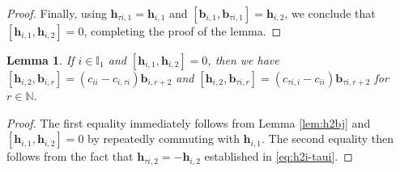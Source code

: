 \documentclass[11pt,reqno]{amsart}
\numberwithin{equation}{section}
\newtheorem{lem}[thm]{Lemma}
\theoremstyle{definition}
\theoremstyle{remark}
\newcommand{\bN}{\mathbb{N}}
\newcommand{\bb}{\mathbf{b}}
\newcommand{\bh}{\mathbf{h}}
\newcommand{\I}{{\mathbb I}}
\begin{document}
\begin{proof}
Finally, using
\(
 \mathbf h_{\tau i,1}=\mathbf h_{i,1}
\)
and
\(
 [\mathbf b_{i,1},\mathbf b_{\tau i,1}]
 =\mathbf h_{i,2}
\),
we conclude that $[\mathbf h_{i,1},\mathbf h_{i,2}]=0$,
completing the proof of  the lemma.
\end{proof}






\begin{lem}\label{lem:h2bj-2}
If $i\in \I_1$ and $[\bh_{i,1},\bh_{i,2}]=0$, then we have $[\bh_{i,2},\bb_{i,r}]=
 (c_{ii}-c_{i,\tau i})\bb_{i,r+2}$ and $[\bh_{i,2},\bb_{\tau i,r}]=
 (c_{\tau i,i}-c_{ii})\bb_{\tau i,r+2}$ for $r\in\bN$.
\end{lem}
\begin{proof}
The first equality immediately follows from Lemma \ref{lem:h2bj} and $[\bh_{i,1},\bh_{i,2}]=0$ by repeatedly commuting with $\bh_{i,1}$. The second equality then follows from the fact that $\bh_{\tau i,2}=-\bh_{i,2}$ established in \eqref{eq:h2i-taui}.
\end{proof}
\end{document}
